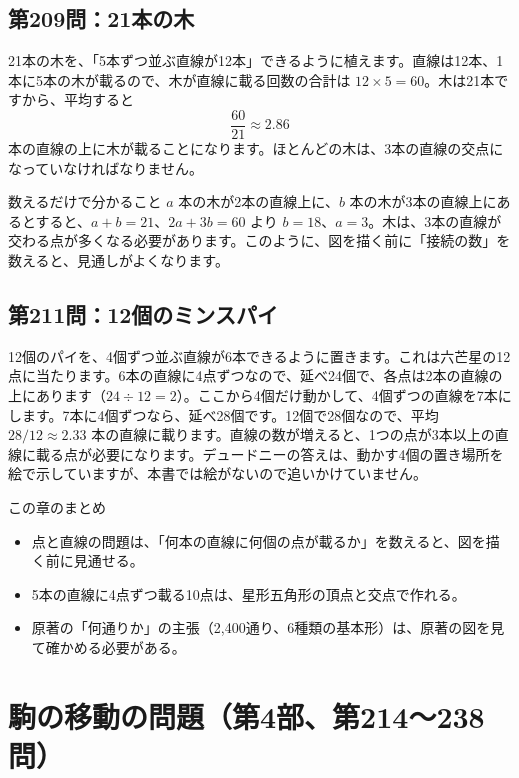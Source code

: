 \documentclass[a4paper,11pt,openany]{ltjsbook}
\begin{document}
\section{第209問：21本の木}

21本の木を、「5本ずつ並ぶ直線が12本」できるように植えます。直線は12本、1本に5本の木が載るので、木が直線に載る回数の合計は $12\times5=60$。木は21本ですから、平均すると
\[
\frac{60}{21}\approx2.86
\]
本の直線の上に木が載ることになります。ほとんどの木は、3本の直線の交点になっていなければなりません。

\begin{pointbox}{数えるだけで分かること}
$a$ 本の木が2本の直線上に、$b$ 本の木が3本の直線上にあるとすると、$a+b=21$、$2a+3b=60$ より $b=18$、$a=3$。木は、3本の直線が交わる点が多くなる必要があります。このように、図を描く前に「接続の数」を数えると、見通しがよくなります。
\end{pointbox}

\section{第211問：12個のミンスパイ}

12個のパイを、4個ずつ並ぶ直線が6本できるように置きます。これは六芒星の12点に当たります。6本の直線に4点ずつなので、延べ24個で、各点は2本の直線の上にあります（$24\div12=2$）。ここから4個だけ動かして、4個ずつの直線を7本にします。7本に4個ずつなら、延べ28個です。12個で28個なので、平均 $28/12\approx2.33$ 本の直線に載ります。直線の数が増えると、1つの点が3本以上の直線に載る点が必要になります。デュードニーの答えは、動かす4個の置き場所を絵で示していますが、本書では絵がないので追いかけていません。

\begin{pointbox}{この章のまとめ}
\begin{itemize}[leftmargin=*]
\item 点と直線の問題は、「何本の直線に何個の点が載るか」を数えると、図を描く前に見通せる。
\item 5本の直線に4点ずつ載る10点は、星形五角形の頂点と交点で作れる。
\item 原著の「何通りか」の主張（2,400通り、6種類の基本形）は、原著の図を見て確かめる必要がある。
\end{itemize}
\end{pointbox}

\chapter{駒の移動の問題（第4部、第214〜238問）}
\end{document}
